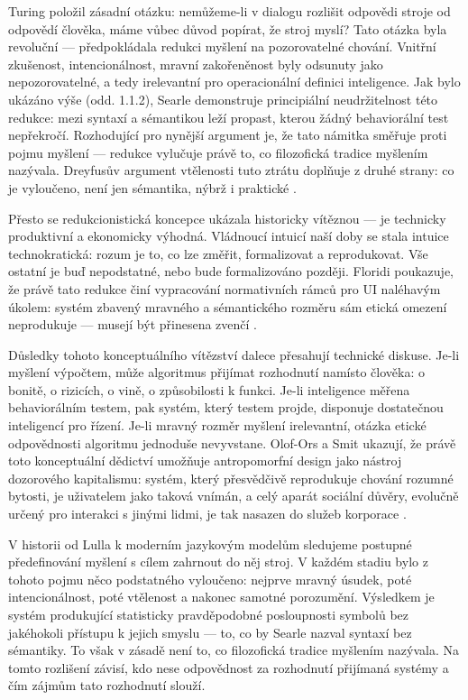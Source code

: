 Turing položil zásadní otázku: nemůžeme-li v dialogu rozlišit odpovědi stroje od odpovědí člověka, máme vůbec důvod popírat, že stroj myslí? \parencite{Turing50}
Tato otázka byla revoluční — předpokládala redukci myšlení na pozorovatelné chování. Vnitřní zkušenost, intencionálnost, mravní zakořeněnost byly odsunuty jako nepozorovatelné, a tedy irelevantní pro operacionální definici inteligence.
Jak bylo ukázáno výše (odd. 1.1.2), Searle demonstruje principiální neudržitelnost této redukce: mezi syntaxí a sémantikou leží propast, kterou žádný behaviorální test nepřekročí.
Rozhodující pro nynější argument je, že tato námitka směřuje proti pojmu myšlení — redukce  vylučuje právě to, co filozofická tradice myšlením nazývala.
Dreyfusův argument vtělenosti tuto ztrátu doplňuje z druhé strany: co je vyloučeno, není jen sémantika, nýbrž i praktické .

Přesto se redukcionistická koncepce  ukázala historicky vítěznou — je technicky produktivní a ekonomicky výhodná.
Vládnoucí intuicí naší doby se stala intuice technokratická: rozum je to, co lze změřit, formalizovat a reprodukovat.
Vše ostatní je buď nepodstatné, nebo bude formalizováno později.
Floridi poukazuje, že právě tato redukce činí vypracování normativních rámců pro UI naléhavým úkolem: systém zbavený mravného a sémantického rozměru sám etická omezení neprodukuje — musejí být přinesena zvenčí \parencite{Floridi23}.

Důsledky tohoto konceptuálního vítězství dalece přesahují technické diskuse.
Je-li myšlení výpočtem, může algoritmus přijímat rozhodnutí namísto člověka: o bonitě, o rizicích, o vině, o způsobilosti k funkci.
Je-li inteligence měřena behaviorálním testem, pak systém, který testem projde, disponuje dostatečnou inteligencí pro řízení.
Je-li mravný rozměr myšlení irelevantní, otázka etické odpovědnosti algoritmu jednoduše nevyvstane.
Olof-Ors a Smit ukazují, že právě toto konceptuální dědictví umožňuje antropomorfní design jako nástroj dozorového kapitalismu: systém, který přesvědčivě reprodukuje chování rozumné bytosti, je uživatelem jako taková vnímán, a celý aparát sociální důvěry, evolučně určený pro interakci s jinými lidmi, je tak nasazen do služeb korporace \parencite{OlofOrsSmit25}.

V historii od Lulla k moderním jazykovým modelům sledujeme postupné předefinování myšlení s cílem zahrnout do něj stroj.
V každém stadiu bylo z tohoto pojmu něco podstatného vyloučeno: nejprve mravný úsudek, poté intencionálnost, poté vtělenost a nakonec samotné porozumění. Výsledkem je systém produkující statisticky pravděpodobné posloupnosti symbolů bez jakéhokoli přístupu k jejich smyslu — to, co by Searle nazval syntaxí bez sémantiky. To však v zásadě není to, co filozofická tradice myšlením nazývala. Na tomto rozlišení závisí, kdo nese odpovědnost za rozhodnutí přijímaná  systémy a čím zájmům tato rozhodnutí slouží.

